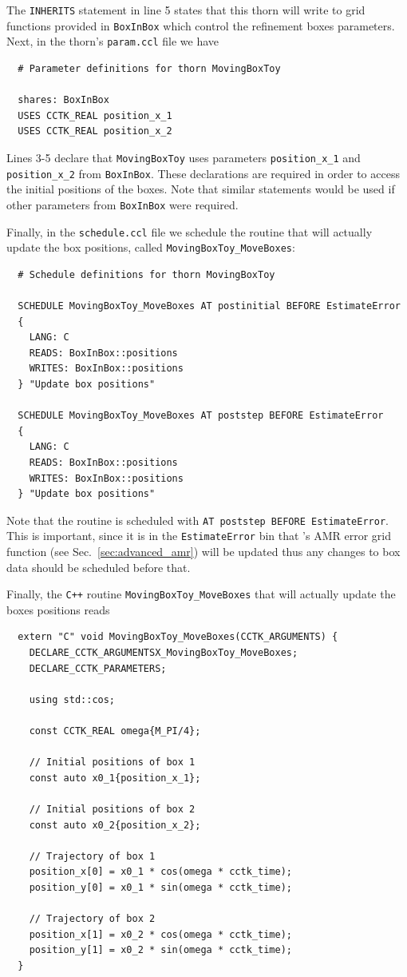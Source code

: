 The \texttt{INHERITS} statement in line 5 states that this thorn will write to grid functions provided in \texttt{BoxInBox} which control the refinement boxes parameters. Next, in the thorn's \texttt{param.ccl} file we have
%
\begin{lstlisting}
  # Parameter definitions for thorn MovingBoxToy

  shares: BoxInBox
  USES CCTK_REAL position_x_1
  USES CCTK_REAL position_x_2
\end{lstlisting}

Lines 3-5 declare that \texttt{MovingBoxToy} uses parameters \texttt{position\_x\_1} and \texttt{position\_x\_2} from \texttt{BoxInBox}. These declarations are required in order to access the initial positions of the boxes. Note that similar statements would be used if other parameters from \texttt{BoxInBox} were required.

Finally, in the \texttt{schedule.ccl} file we schedule the routine that will actually update the box positions, called \texttt{MovingBoxToy\_MoveBoxes}:
%
\begin{lstlisting}
  # Schedule definitions for thorn MovingBoxToy

  SCHEDULE MovingBoxToy_MoveBoxes AT postinitial BEFORE EstimateError
  {
    LANG: C
    READS: BoxInBox::positions
    WRITES: BoxInBox::positions
  } "Update box positions"

  SCHEDULE MovingBoxToy_MoveBoxes AT poststep BEFORE EstimateError
  {
    LANG: C
    READS: BoxInBox::positions
    WRITES: BoxInBox::positions
  } "Update box positions"
\end{lstlisting}

Note that the routine is scheduled with \texttt{AT poststep BEFORE EstimateError}. This is important, since it is in the \texttt{EstimateError} bin that \CarpetX's AMR error grid function (see Sec.~\ref{sec:advanced_amr}) will be updated thus any changes to box data should be scheduled before that.

Finally, the \texttt{C++} routine \texttt{MovingBoxToy\_MoveBoxes} that will actually update the boxes positions reads
%
\begin{lstlisting}
  extern "C" void MovingBoxToy_MoveBoxes(CCTK_ARGUMENTS) {
    DECLARE_CCTK_ARGUMENTSX_MovingBoxToy_MoveBoxes;
    DECLARE_CCTK_PARAMETERS;

    using std::cos;

    const CCTK_REAL omega{M_PI/4};

    // Initial positions of box 1
    const auto x0_1{position_x_1};

    // Initial positions of box 2
    const auto x0_2{position_x_2};

    // Trajectory of box 1
    position_x[0] = x0_1 * cos(omega * cctk_time);
    position_y[0] = x0_1 * sin(omega * cctk_time);

    // Trajectory of box 2
    position_x[1] = x0_2 * cos(omega * cctk_time);
    position_y[1] = x0_2 * sin(omega * cctk_time);
  }
\end{lstlisting}

